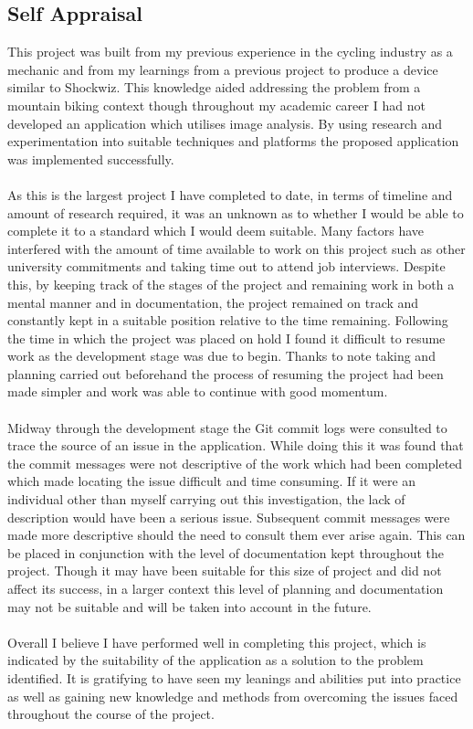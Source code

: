 	\subsection{Self Appraisal}
		This project was built from my previous experience in the cycling industry as a mechanic and from my learnings from a previous project to produce a device similar to Shockwiz. This knowledge aided addressing the problem from a mountain biking context though throughout my academic career I had not developed an application which utilises image analysis. By using research and experimentation into suitable techniques and platforms the proposed application was implemented successfully.
		\\\\
		As this is the largest project I have completed to date, in terms of timeline and amount of research required, it was an unknown as to whether I would be able to complete it to a standard which I would deem suitable. Many factors have interfered with the amount of time available to work on this project such as other university commitments and taking time out to attend job interviews. Despite this, by keeping track of the stages of the project and remaining work in both a mental manner and in documentation, the project remained on track and constantly kept in a suitable position relative to the time remaining. Following the time in which the project was placed on hold I found it difficult to resume work as the development stage was due to begin. Thanks to note taking and planning carried out beforehand the process of resuming the project had been made simpler and work was able to continue with good momentum.
		\\\\
		Midway through the development stage the Git commit logs were consulted to trace the source of an issue in the application. While doing this it was found that the commit messages were not descriptive of the work which had been completed which made locating the issue difficult and time consuming. If it were an individual other than myself carrying out this investigation, the lack of description would have been a serious issue. Subsequent commit messages were made more descriptive should the need to consult them ever arise again. This can be placed in conjunction with the level of documentation kept throughout the project. Though it may have been suitable for this size of project and did not affect its success, in a larger context this level of planning and documentation may not be suitable and will be taken into account in the future.
		\\\\
		Overall I believe I have performed well in completing this project, which is indicated by the suitability of the application as a solution to the problem identified. It is gratifying to have seen my leanings and abilities put into practice as well as gaining new knowledge and methods from overcoming the issues faced throughout the course of the project.